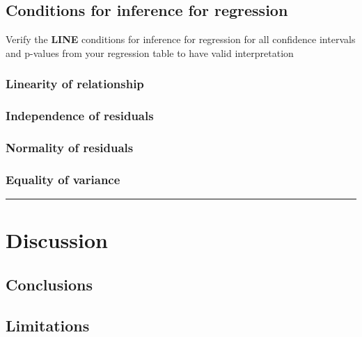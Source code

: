 \documentclass[
]{article}
\begin{document}
\hypertarget{conditions-for-inference-for-regression}{%
\subsection{Conditions for inference for
regression}\label{conditions-for-inference-for-regression}}

Verify the \textbf{LINE} conditions for inference for regression for all
confidence intervals and p-values from your regression table to have
valid interpretation

\hypertarget{linearity-of-relationship}{%
\subsubsection{Linearity of
relationship}\label{linearity-of-relationship}}

\hypertarget{independence-of-residuals}{%
\subsubsection{Independence of
residuals}\label{independence-of-residuals}}

\hypertarget{normality-of-residuals}{%
\subsubsection{Normality of residuals}\label{normality-of-residuals}}

\hypertarget{equality-of-variance}{%
\subsubsection{Equality of variance}\label{equality-of-variance}}

\begin{center}\rule{0.5\linewidth}{0.5pt}\end{center}

\hypertarget{discussion}{%
\section{Discussion}\label{discussion}}

\hypertarget{conclusions}{%
\subsection{Conclusions}\label{conclusions}}

\hypertarget{limitations}{%
\subsection{Limitations}\label{limitations}}
\end{document}
